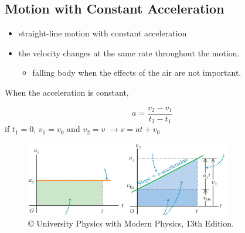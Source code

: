 \documentclass[]{beamer}
\begin{document}
\subsection{Motion with Constant Acceleration}




\begin{frame}

   \begin{itemize}
      \item straight-line motion with constant
      acceleration
      \vspace{3mm}
      \pause
  
      \item the velocity changes at the same rate throughout the
      motion.
      \pause
         \begin{itemize}
           \item falling body when  the effects of the air are not important.
         \end{itemize}
   \end{itemize}
\end{frame}

\begin{frame}
   When the acceleration is constant,
   \vspace{3mm}
   \pause
   
   \begin{equation}
   a=\frac{v_2-v_1}{t_2-t_1}
   \end{equation}
   \pause
   \vspace{3mm}
   \pause
   if $t_1=0$, $v_1=v_0$ and $v_2=v$ $ \rightarrow v=at+v_0 $

   


   \begin{figure}[h!]
 
      \includegraphics[width=0.8\textwidth]{images/15.jpg}
      \caption{ {\tiny © University Physics 
      with Modern Physics, 13th Edition.} }
    \end{figure}



 \end{frame}
\end{document}
